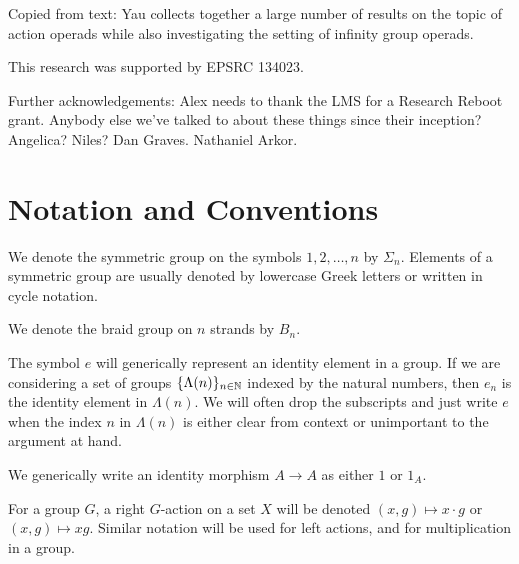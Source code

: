 Copied from text:
Yau \cite{yau_infinity_2021} collects together a large number of results on the topic of action operads while also investigating the setting of infinity group operads. 

This research was supported by EPSRC 134023.

Further acknowledgements:
Alex needs to thank the LMS for a Research Reboot grant. Anybody else we've talked to about these things since their inception? Angelica? Niles? Dan Graves. Nathaniel Arkor.




\section{Notation and Conventions}\label{sec:notation}

\begin{nota}\label{nota:symm_sigma}
We denote the symmetric group on the symbols $1, 2, \ldots, n$ by $\Sigma_n$. Elements of a symmetric group are usually denoted by lowercase Greek letters or written in cycle notation.
\end{nota}

\begin{nota}\label{nota:braid}
We denote the braid group on $n$ strands by $B_n$.
\end{nota}

\begin{nota}\label{nota:e_identity}
The symbol $e$ will generically represent an identity element in a group. If we are considering a set of groups $\{ \Lambda(n) \}_{n \in \mathbb{N}}$ indexed by the natural numbers, then $e_{n}$ is the identity element in $\Lambda(n)$. We will often drop the subscripts and just write $e$ when the index $n$ in $\Lambda(n)$ is either clear from context or unimportant to the argument at hand.
\end{nota}

\begin{conv}\label{conv:1_id}
We generically write an identity morphism $A \to A$ as either $1$ or $1_A$.
\end{conv}

\begin{nota}\label{nota:g-action}
For a group $G$, a right $G$-action on a set $X$ will be denoted $(x,g) \mapsto x \cdot g$ or $(x,g) \mapsto x g$. 
Similar notation will be used for left actions, and for multiplication in a group.
\end{nota}

